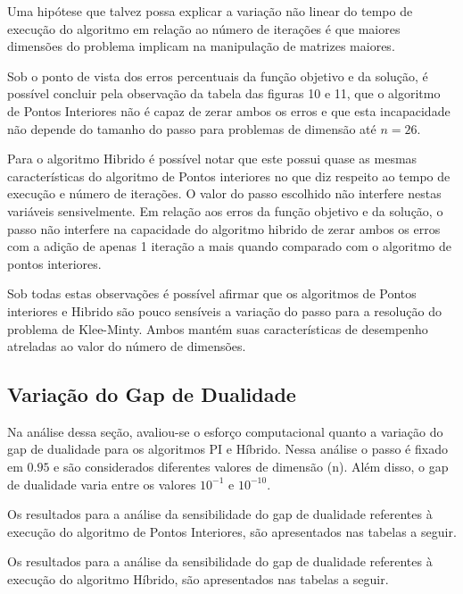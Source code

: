 \documentclass[11pt,a4paper]{article}
\begin{document}
            Uma hipótese que talvez possa explicar a variação não linear do tempo de execução do algoritmo em relação ao número de iterações é que maiores dimensões do problema implicam na manipulação de matrizes maiores.

            Sob o ponto de vista dos erros percentuais da função objetivo e da solução, é possível concluir pela observação da tabela das figuras 10 e 11, que o algoritmo de Pontos Interiores não é capaz de zerar ambos os erros e que esta incapacidade não depende do tamanho do passo para problemas de dimensão até $n=26$.  

            Para o algoritmo Hibrido é possível notar que este possui quase as mesmas características do algoritmo de Pontos interiores no que diz respeito ao tempo de execução e número de iterações. O valor do passo escolhido não interfere nestas variáveis sensivelmente. Em relação aos erros da função objetivo e da solução, o passo não interfere na capacidade do algoritmo hibrido de zerar ambos os erros com a adição de apenas 1 iteração a mais quando comparado com o algoritmo de pontos interiores.

            Sob todas estas observações é possível afirmar que os algoritmos de Pontos interiores e Hibrido são pouco sensíveis a variação do passo para a resolução do problema de Klee-Minty. Ambos mantém suas características de desempenho atreladas ao valor do número de dimensões.
        
    
    \subsection{Variação do Gap de Dualidade}

        Na análise dessa seção, avaliou-se o esforço computacional quanto a variação do gap de dualidade para os algoritmos PI e Híbrido. Nessa análise o passo é fixado em $0.95$ e são considerados diferentes valores de dimensão (n). Além disso, o gap de dualidade varia entre os valores $10^{-1}$ e $10^{-10}$.
        
        Os resultados para a análise da sensibilidade do gap de dualidade referentes à execução do algoritmo de Pontos Interiores, são apresentados nas tabelas a seguir.

        

        Os resultados para a análise da sensibilidade do gap de dualidade referentes à execução do algoritmo Híbrido, são apresentados nas tabelas a seguir.
\end{document}
